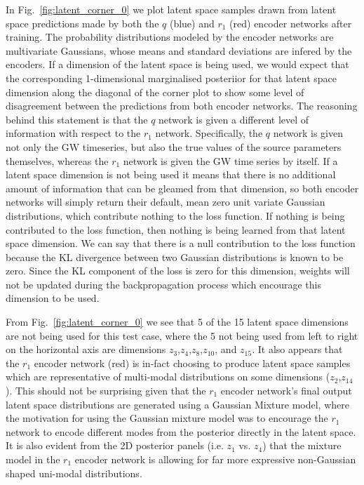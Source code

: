 In Fig.~\ref{fig:latent_corner_0} we plot latent space samples drawn from 
latent space predictions made by both the $q$ (blue) and $r_1$ (red) 
encoder networks after training. The probability distributions modeled by 
the encoder networks are multivariate Gaussians, whose means and 
standard deviations 
are infered by the encoders. If a dimension of the latent space is 
being used, we would expect that the corresponding 1-dimensional
marginalised posteriior for that latent space dimension along the diagonal 
of the corner plot to show some level of disagreement between the 
predictions from both encoder networks. The reasoning behind this 
statement is that the $q$ network is given a different level of 
information with respect to the $r_1$ network. Specifically, the 
$q$ network is given not only the \ac{GW} timeseries, but also the true 
values of the source parameters themselves, whereas the $r_1$ network 
is given the \ac{GW} time series by itself. If a latent space dimension 
is not being used it means that there is no additional amount of 
information that can be gleamed from that dimension, so both encoder 
networks will simply return their default, mean zero unit variate 
Gaussian distributions, which contribute nothing to the loss function. 
If nothing is being contributed to the loss function, then nothing is 
being learned from that latent space dimension. We can say that there is a 
null contribution to the loss function because the \ac{KL} divergence 
between two Gaussian distributions is known to be zero. Since the 
\ac{KL} component of the loss is zero for this dimension, weights will 
not be updated during the backpropagation process which encourage this 
dimension to be used.~ 

%
%
From Fig.~\ref{fig:latent_corner_0} we see that 5 of the 15 latent 
space dimensions are not being used for this test case, where the  
5 not being used from left to right on the horizontal axis are 
dimensions $z_3$,$z_4$,$z_8$,$z_{10}$, and $z_{15}$. It also appears that the $r_1$ encoder 
network (red) is in-fact choosing to produce latent space samples 
which are representative of multi-modal distributions on some dimensions ($z_2$,$z_{14}$). 
This should not be 
surprising given that the $r_1$ encoder network's final output 
latent space distributions are generated using a Gaussian Mixture 
model, where the motivation for using the Gaussian mixture model 
was to encourage the $r_1$ network to encode different modes from the posterior 
directly in the latent space. It is also evident from the 2D posterior panels (i.e. $z_1$ vs. $z_{4}$)
that the mixture model in the $r_1$ encoder network is allowing for far more 
expressive non-Gaussian shaped uni-modal distributions.

